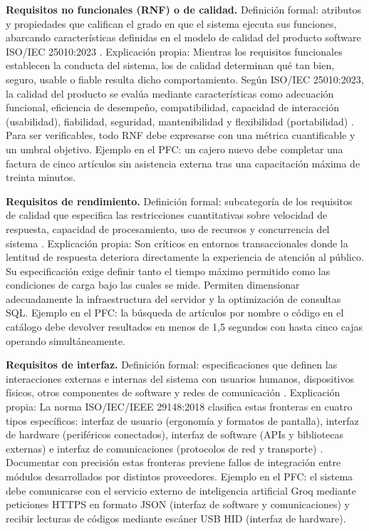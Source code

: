 \documentclass[onecolumn,12pt,a4paper]{IEEEtran}
\begin{document}
	\textbf{Requisitos no funcionales (RNF) o de calidad.} Definici\'on formal: atributos y propiedades que califican el grado en que el sistema ejecuta sus funciones, abarcando caracter\'isticas definidas en el modelo de calidad del producto software ISO/IEC 25010:2023 \cite{iso25010,pohl2025,glinz2007}. Explicaci\'on propia: Mientras los requisitos funcionales establecen la conducta del sistema, los de calidad determinan qu\'e tan bien, seguro, usable o fiable resulta dicho comportamiento. Seg\'un ISO/IEC 25010:2023, la calidad del producto se eval\'ua mediante caracter\'isticas como adecuaci\'on funcional, eficiencia de desempe\~no, compatibilidad, capacidad de interacci\'on (usabilidad), fiabilidad, seguridad, mantenibilidad y flexibilidad (portabilidad) \cite{iso25010}.
	Para ser verificables, todo RNF debe expresarse con una m\'etrica cuantificable y un umbral objetivo. Ejemplo en el PFC: un cajero nuevo debe completar una factura de cinco art\'iculos sin asistencia externa tras una capacitaci\'on m\'axima de treinta minutos.

	\textbf{Requisitos de rendimiento.} Definici\'on formal: subcategor\'ia de los requisitos de calidad que especifica las restricciones cuantitativas sobre velocidad de respuesta, capacidad de procesamiento, uso de recursos y concurrencia del sistema \cite{iso29148,iso25010,wiegers2013}. Explicaci\'on propia: Son cr\'iticos en entornos transaccionales donde la lentitud de respuesta deteriora directamente la experiencia de atenci\'on al p\'ublico. Su especificaci\'on exige definir tanto el tiempo m\'aximo permitido como las condiciones de carga bajo las cuales se mide. Permiten dimensionar adecuadamente la infraestructura del servidor y la optimizaci\'on de consultas SQL. Ejemplo en el PFC: la b\'usqueda de art\'iculos por nombre o c\'odigo en el cat\'alogo debe devolver resultados en menos de 1,5 segundos con hasta cinco cajas operando simult\'aneamente.

	\textbf{Requisitos de interfaz.} Definici\'on formal: especificaciones que definen las interacciones externas e internas del sistema con usuarios humanos, dispositivos f\'isicos, otros componentes de software y redes de comunicaci\'on \cite{iso29148,hull2011}. Explicaci\'on propia: La norma ISO/IEC/IEEE 29148:2018 clasifica estas fronteras en cuatro tipos espec\'ificos: interfaz de usuario (ergonom\'ia y formatos de pantalla), interfaz de hardware (perif\'ericos conectados), interfaz de software (APIs y bibliotecas externas) e interfaz de comunicaciones (protocolos de red y transporte) \cite{iso29148}.
	Documentar con precisi\'on estas fronteras previene fallos de integraci\'on entre m\'odulos desarrollados por distintos proveedores. Ejemplo en el PFC: el sistema debe comunicarse con el servicio externo de inteligencia artificial Groq mediante peticiones HTTPS en formato JSON (interfaz de software y comunicaciones) y recibir lecturas de c\'odigos mediante esc\'aner USB HID (interfaz de hardware).
\end{document}
